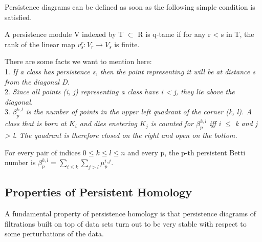 Persistence diagrams can be defined as soon as the following simple condition is satisfied.
\begin{definition}
A persistence module V indexed by T $\subset$ R is q-tame if for any r < s in T, the rank of the linear map $v^r_s : V_r \rightarrow V_s$ is finite.
\end{definition}

There are some facts we want to mention here: \\
1. \textit{If a class has persistence s, then the point representing it will be at distance s from the diagonal D.} \\ 
2. \textit{Since all points (i, j) representing a class have i < j, they lie above the diagonal.} \\ 
3. \textit{ $\beta^{k,l}_p$ is the number of points in the upper left quadrant of the corner (k, l). A class that is born at $K_i$ and dies enetering $K_j$ is counted for $\beta^{k,l}_p$ iff i $\leq$ k and j > l. The quadrant is therefore closed on the right and open on the bottom.}
\begin{definition}
For every pair of indices $0 \leq k \leq l \leq n$ and every p, the p-th persistent Betti number is $\beta^{k,l}_p = \sum_{i \leq k} \sum_{j > l} \mu_p^{i, j}$.  
\end{definition}

\subsection{Properties of Persistent Homology}
A fundamental property of persistence homology is that persistence diagrams of filtrations built on top of data sets turn out to be very stable with respect to some perturbations of the data.


